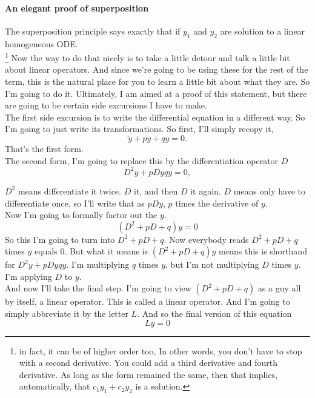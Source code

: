 \paragraph{An elegant proof of superposition}
The superposition principle says exactly that if $y_1$ and $y_2$ are solution to a  linear homogeneous ODE. \\
\footnote{in fact, it can be of higher order too, In other words, you don't have to stop
with a second derivative. You could add a third derivative and fourth derivative.
As long as the form remained the same, then that implies, automatically, that $c_1 y_1 + c_2 y_2$
is a solution.}
Now the way to do that nicely is to take a little detour and talk a little bit about
{\color{blue}linear operators}.
And since we're going to be using these for the rest of the term, this is the natural place for you
to learn a little bit about what they are.
So I'm going to do it.
Ultimately, I am aimed at a proof of this statement, but there are going to be certain side
excursions I have to make.\\

The first side excursion is to write the differential equation in a different way.
So I'm going to just write its transformations.
So first, I'll simply recopy it, 
\begin{equation*}
  \ddot y + p\dot y + qy = 0. 
\end{equation*}
That's the first form. \\
The second form, I'm going to replace this by the differentiation operator $D$
\begin{equation*}
  D^2 y + pDy qy = 0, 
\end{equation*}

$D^2$ means differentiate it twice. $D$ it, and then $D$ it again.
$D$ means only have to differentiate once, so I'll write that as $p Dy$, $p$ times the derivative of $y$.\\
Now I'm going to formally factor out the $y$.
\begin{equation*}
  \left( D^2 + pD + q \right)y = 0 
\end{equation*}
So this I'm going to turn into $D^2 +  pD + q$.
Now everybody reads $D^2 +  pD + q$ times $y$ equals $0$.
But what it means is $(D^2 + pD + q)y$ means this is shorthand for
$D^2 y + pDy qy$.
I'm multiplying $q$ times $y$, but I'm not multiplying $D$ times $y$.
I'm applying $D$ to $y$. \\
And now I'll take the final step.
I'm going to view $(D^2 + pD + q)$ as a guy all by itself, a {\color{blue} linear operator}.
This is called a linear operator.
And I'm going to simply abbreviate it by the letter $L$.
And so the final version of this equation
\begin{equation*}
  Ly = 0
\end{equation*}

